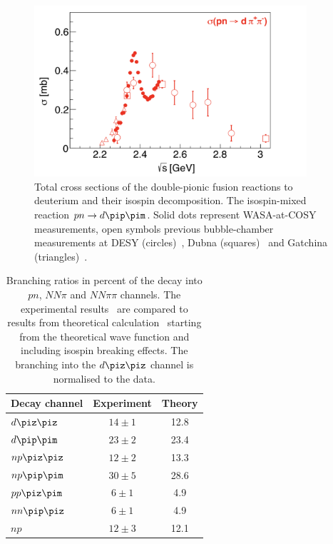 \begin{figure} [htb]
    \centering
    \includegraphics[width=0.9\textwidth]{gfx/wasares4}
	\caption{Total cross sections of the double-pionic fusion reactions to deuterium and their isospin decomposition. The isospin-mixed reaction $pn \rightarrow d \pip \pim$. Solid dots represent WASA-at-COSY measurements, open symbols previous bubble-chamber measurements at DESY (circles)~\cite{dasy}, Dubna (squares)~\cite{dubna} and Gatchina (triangles)~\cite{gatchina}.}
	\label{fig:wasares2}
\end{figure}

\begingroup
\renewcommand{\arraystretch}{1.2} %
\begin{table} [htb]
\centering
\begin{tabularx}{0.7\textwidth}{Xcc}
\toprule
\textbf{Decay channel}    &   \textbf{Experiment}   &   \textbf{Theory}  \\
\midrule
$d\piz\piz$               &         $14\pm1$        &        12.8        \\
$d\pip\pim$               &         $23\pm2$        &        23.4        \\
$np\piz\piz$              &         $12\pm2$        &        13.3        \\
$np\pip\pim$              &         $30\pm5$        &        28.6        \\
$pp\piz\pim$              &         $ 6\pm1$        &         4.9        \\
$nn\pip\piz$              &         $ 6\pm1$        &         4.9        \\
$np$                      &         $12\pm3$        &        12.1        \\
\bottomrule
\end{tabularx}
\caption{Branching ratios in percent of the \dst decay into $pn$, $NN\pi$ and $NN\pi\pi$ channels. The experimental results~\cite{widthpred3} are compared to results from theoretical calculation~\cite{brcalc,brpred1,brpred2} starting from the theoretical \ds wave function and including isospin breaking effects. The branching into the $d\piz\piz$ channel is normalised to the data.}
\label{tab:br}
\end{table}
\endgroup

